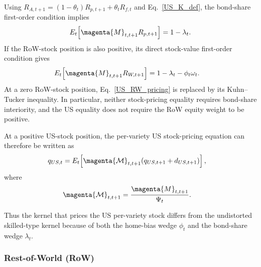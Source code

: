 \documentclass{article}
\def\green#1{#1}%
\begin{document}
Using $R_{A,t+1}=(1-\theta_t)R_{p,t+1}+\theta_tR_{f,t}$ and Eq.~\eqref{US_K_def}, the bond-share first-order condition implies
\begin{align}\label{US_Rp_pricing}
E_t\!\left[\magenta{M}_{t,t+1}R_{p,t+1}\right]
=
1-\lambda_t.
\end{align}
\green{If the RoW-stock position is also positive}, \green{its direct stock-value first-order condition gives}
\begin{align}
E_t\!\left[\magenta{M}_{t,t+1}R_{W,t+1}\right]
&=
1-\lambda_t-\phi_t\omega_t.\label{US_RW_pricing}
\end{align}
\green{At a zero RoW-stock position}, \green{Eq}.~\green{\eqref{US_RW_pricing} is replaced by its Kuhn--Tucker inequality}.  \green{In particular}, \green{neither stock-pricing equality requires bond-share interiority}, \green{and the US equality does not require the RoW equity weight to be positive}.

\green{At a positive US-stock position}, the per-variety \green{US} stock-pricing \green{equation} can \green{therefore} be written as
\begin{align}
q_{US,t}
&=
E_t\!\left[\magenta{\mathcal M}_{t,t+1}(q_{US,t+1}+d_{US,t+1})\right],\label{US_AP_bond_cost}
\end{align}
\green{where}
\begin{align*}
\magenta{\mathcal M}_{t,t+1}
&=
\frac{\magenta{M}_{t,t+1}}{\green{\Psi}_t}.
\end{align*}

Thus the kernel that prices the US per-variety stock differs from the undistorted skilled-type kernel  because of both the home-bias wedge $\phi_t$ and the bond-share wedge $\lambda_t$.

\subsubsection{Rest-of-World (RoW)}
\end{document}
